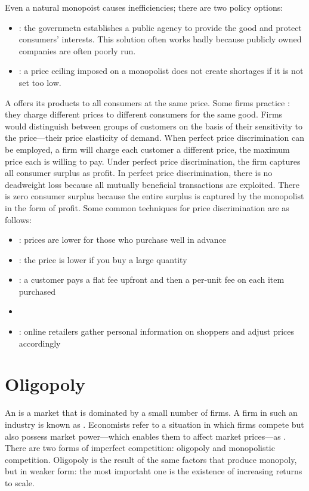 \documentclass{article}
\begin{document}
Even a natural monopoist causes inefficiencies; there are two policy options:
\begin{itemize}
  \item {}: the governmetn establishes a public agency to provide the good and protect consumers' interests. This solution often works badly because publicly owned companies are often poorly run. 
  \item {}: a price ceiling imposed on a monopolist does not create shortages if it is not set too low. 
\end{itemize}

A  offers its products to all consumers at the same price. Some firms practice : they charge different prices to different consumers for the same good. Firms would distinguish between groups of customers on the basis of their sensitivity to the price---their price elasticity of demand.  When perfect price discrimination can be employed, a firm will charge each customer a different price, the maximum price each is willing to pay. Under perfect price discrimination, the firm captures all consumer surplus as profit. In perfect price discrimination, there is no deadweight loss because all mutually beneficial transactions are exploited. There is zero consumer surplus because the entire surplus is captured by the monopolist in the form of profit. Some common techniques for price discrimination are as follows: 
\begin{itemize}
  \item {}: prices are lower for those who purchase well in advance 
  \item {}: the price is lower if you buy a large quantity 
  \item {}: a customer pays a flat fee upfront and then a per-unit fee on each item purchased
  \item {}
  \item {}: online retailers gather personal information on shoppers and adjust prices accordingly
\end{itemize}

\section{Oligopoly}

An  is a market that is dominated by a small number of firms. A firm in such an industry is known as . Economists refer to a situation in which firms compete but also possess market power---which enables them to affect market prices---as . There are two forms of imperfect competition: oligopoly and monopolistic competition. Oligopoly is the result of the same factors that produce monopoly, but in weaker form: the most importaht one is the existence of increasing returns to scale. \\ 
\end{document}
